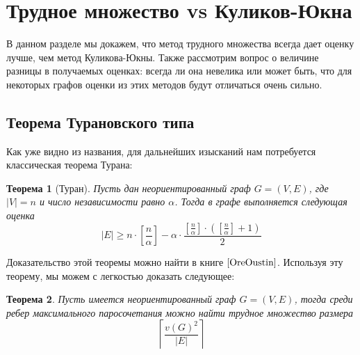\documentclass[a4paper]{article}
\newtheorem*{mtheorem}{Теорема}
\begin{document}
\addtocounter{section}{1}
\section*{Трудное множество vs Куликов-Юкна}
В данном разделе мы докажем, что метод трудного множества всегда дает оценку лучше, чем метод Куликова-Юкны.
Также рассмотрим вопрос о величине разницы в получаемых оценках: всегда ли она невелика или может быть, 
что для некоторых графов оценки из этих методов будут отличаться очень сильно. 

\setcounter{subsection}{0}
\subsection{Теорема Турановского типа}
Как уже видно из названия, для дальнейших изысканий нам потребуется классическая теорема Турана:
\begin{mtheorem}[Туран]
    Пусть дан неориентированный граф $G = (V, E)$, где $|V| = n$ и число независимости равно $\alpha$. 
    Тогда в графе выполняется следующая оценка $$|E| \geq n\cdot\left[\frac{n}{\alpha}\right] - 
    \alpha\cdot\frac{\left[\frac{n}{\alpha}\right]\cdot\left(\left[\frac{n}{\alpha}\right] + 1\right)}{2}$$
\end{mtheorem}

Доказательство этой теоремы можно найти в книге $\cite{OreOustin}$. Используя эту теорему, мы можем с легкостью 
доказать следующее:
\begin{mtheorem}
    Пусть имеется неориентированный граф $G = (V, E)$, тогда среди ребер максимального паросочетания можно 
    найти трудное множество размера $$\left\lceil\frac{v(G)^2}{|E|}\right\rceil$$
\end{mtheorem}
\end{document}
